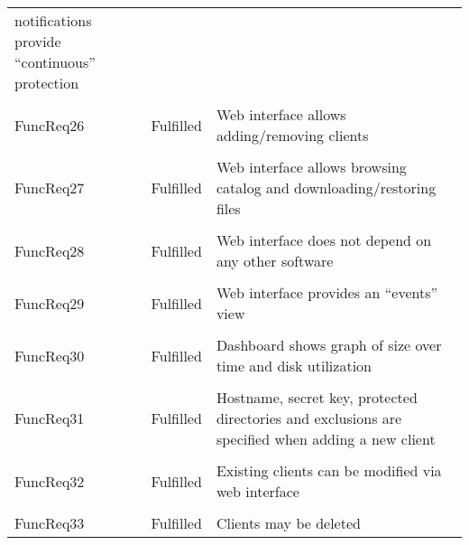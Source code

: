 \begin{longtable}{ l l p{5cm} }
                                                      notifications provide
                                                      ``continuous''
                                                      protection
    \\ \\
    FuncReq26           & Fulfilled                 & Web interface allows
                                                      adding/removing
                                                      clients
    \\ \\
    FuncReq27           & Fulfilled                 & Web interface allows
                                                      browsing catalog and
                                                      downloading/restoring
                                                      files
    \\ \\
    FuncReq28           & Fulfilled                 & Web interface does not
                                                      depend on any other
                                                      software
    \\ \\
    FuncReq29           & Fulfilled                 & Web interface provides an
                                                      ``events'' view
    \\ \\
    FuncReq30           & Fulfilled                 & Dashboard shows graph of
                                                      size over time and disk
                                                      utilization
    \\ \\
    FuncReq31           & Fulfilled                 & Hostname, secret key,
                                                      protected directories and
                                                      exclusions are specified
                                                      when adding a new client
    \\ \\
    FuncReq32           & Fulfilled                 & Existing clients can be
                                                      modified via web
                                                      interface
    \\ \\
    FuncReq33           & Fulfilled                 & Clients may be deleted

\end{longtable}
